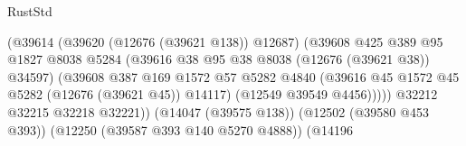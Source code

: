 \begin{lexlean}{RustStd}
\begin{coremodule}
                                                      (@39614
                                                        (@39620 (@12676 (@39621 @138)) @12687)
                                                        (@39608
                                                          @425
                                                          @389
                                                          @95
                                                          @1827
                                                          @8038
                                                          @5284
                                                          (@39616
                                                            @38
                                                            @95
                                                            @38
                                                            @8038
                                                            (@12676 (@39621 @38))
                                                            @34597)
                                                          (@39608
                                                            @387
                                                            @169
                                                            @1572
                                                            @57
                                                            @5282
                                                            @4840
                                                            (@39616
                                                              @45
                                                              @1572
                                                              @45
                                                              @5282
                                                              (@12676 (@39621 @45))
                                                              @14117)
                                                            (@12549 @39549 @4456)))))
                                                    @32212
                                                    @32215
                                                    @32218
                                                    @32221))
                                                (@14047 (@39575 @138))
                                                (@12502 (@39580 @453 @393))
                                                (@12250 (@39587 @393 @140 @5270 @4888))
                                                (@14196

\end{coremodule}
\end{lexlean}
